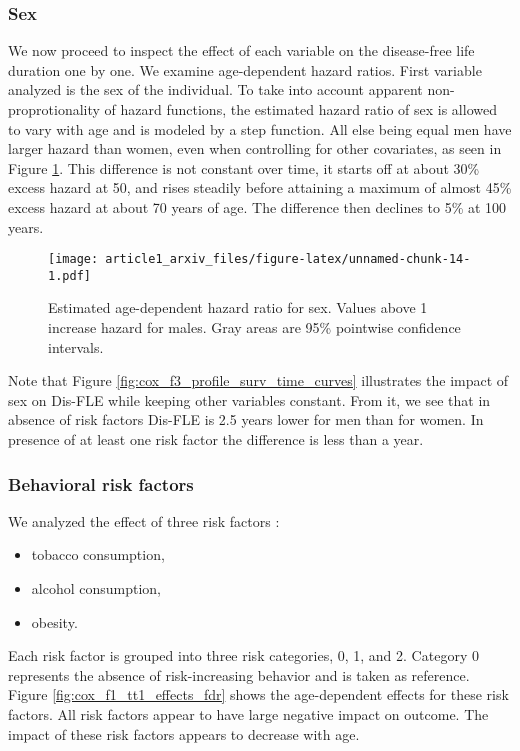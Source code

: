 \documentclass{article}
\providecommand{\tightlist}{%
  \setlength{\itemsep}{0pt}\setlength{\parskip}{0pt}}
\begin{document}
\hypertarget{sex}{%
\subsubsection{Sex}\label{sex}}

We now proceed to inspect the effect of each variable on the
disease-free life duration one by one. We examine age-dependent hazard
ratios. First variable analyzed is the sex of the individual. To take
into account apparent non-proprotionality of hazard functions, the
estimated hazard ratio of sex is allowed to vary with age and is modeled
by a step function. All else being equal men have larger hazard than
women, even when controlling for other covariates, as seen in Figure
\ref{fig:cox_f1_tt1_effects_sex}. This difference is not constant over
time, it starts off at about 30\% excess hazard at 50, and rises
steadily before attaining a maximum of almost 45\% excess hazard at
about 70 years of age. The difference then declines to 5\% at 100 years.

\begin{figure}
\centering
\texttt{[image: article1\_arxiv\_files/figure-latex/unnamed-chunk-14-1.pdf]}
\caption{\label{fig:cox_f1_tt1_effects_sex} Estimated age-dependent
hazard ratio for sex. Values above 1 increase hazard for males. Gray
areas are 95\% pointwise confidence intervals.}
\end{figure}

Note that Figure \ref{fig:cox_f3_profile_surv_time_curves} illustrates
the impact of sex on Dis-FLE while keeping other variables constant.
From it, we see that in absence of risk factors Dis-FLE is 2.5 years
lower for men than for women. In presence of at least one risk factor
the difference is less than a year.

\hypertarget{behavioral-risk-factors}{%
\subsubsection{Behavioral risk factors}\label{behavioral-risk-factors}}

We analyzed the effect of three risk factors :

\begin{itemize}
\tightlist
\item
  tobacco consumption,
\item
  alcohol consumption,
\item
  obesity.
\end{itemize}

Each risk factor is grouped into three risk categories, 0, 1, and 2.
Category 0 represents the absence of risk-increasing behavior and is
taken as reference. Figure \ref{fig:cox_f1_tt1_effects_fdr} shows the
age-dependent effects for these risk factors. All risk factors appear to
have large negative impact on outcome. The impact of these risk factors
appears to decrease with age.
\end{document}
